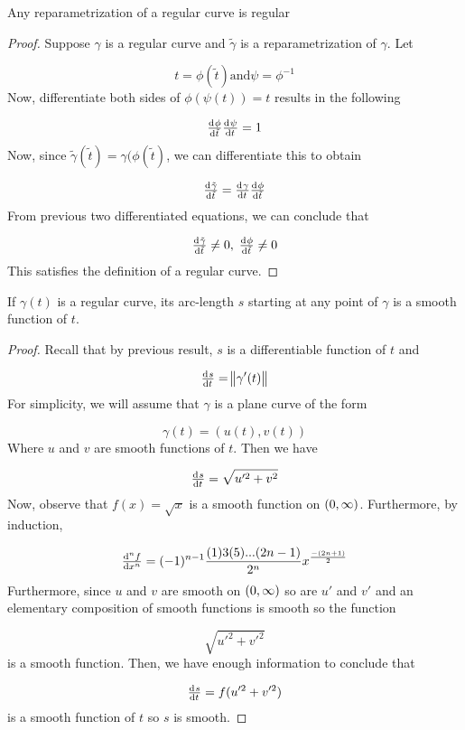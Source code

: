 \begin{proposition}
		Any reparametrization of a regular curve is regular


\begin{proof}
			Suppose \(\gamma\) is a regular curve and \(\tilde{\gamma}\) is a reparametrization of \(\gamma\). Let

\[
t = \phi(\tilde{t}) \text{and} \psi = \phi^{-1}
\]
			Now, differentiate both sides of \(\phi(\psi(t)) = t\) results in the following

\[
\od{\phi}{\tilde{t}} \od{\psi}{t} = 1
\]
			Now, since \(\tilde{\gamma}(\tilde{t}) = \gamma(\phi(\tilde{t})\), we can differentiate this to obtain

\[
\od{\tilde{\gamma}}{\tilde{t}} = \od{\gamma}{t} \od{\phi}{\tilde{t}}
\]
			From previous two differentiated equations, we can conclude that

\[
\od{\tilde{\gamma}}{\tilde{t}} \not = 0, \; \od{\phi}{\tilde{t}} \not = 0
\]
			This satisfies the definition of a regular curve.

\end{proof}

\end{proposition}


\begin{proposition}
		If \(\gamma(t)\) is a regular curve, its arc-length \(s\) starting at any point of \(\gamma\) is a smooth function of \(t\).

\begin{proof}
			Recall that by previous result, \(s\) is a differentiable function of \(t\) and

\[
\od{s}{t} = \norm{\gamma'(t)}
\]
			For simplicity, we will assume that \(\gamma\) is a plane curve of the form

\[
\gamma(t) = (u(t), v(t))
\]
			Where \(u\) and \(v\) are smooth functions of \(t\). Then we have

\[
\od{s}{t} = \sqrt{u'^{2} + v^{2}}
\]
			Now, observe that \(f(x) = \sqrt{x}\) is a smooth function on \(\intoo{0, \infty}\). Furthermore, by induction,

\[
\od[n]{f}{x} = (-1)^{n-1} \frac{(1)3(5)...(2n - 1)}{2^{n}} x^{\frac{-(2n + 1)}{2}}
\]
			Furthermore, since \(u\) and \(v\) are smooth on \(\intoo{0, \infty}\) so are \(u'\) and \(v'\) and an elementary composition of smooth functions is smooth so the function

\[
\sqrt{u'^{2} + v'^{2}}
\]
			is a smooth function. Then, we have enough information to conclude that

\[
\od{s}{t} = f(u'^{2} + v'^{2})
\]
			is a smooth function of \(t\) so \(s\) is smooth.

\end{proof}

\end{proposition}


